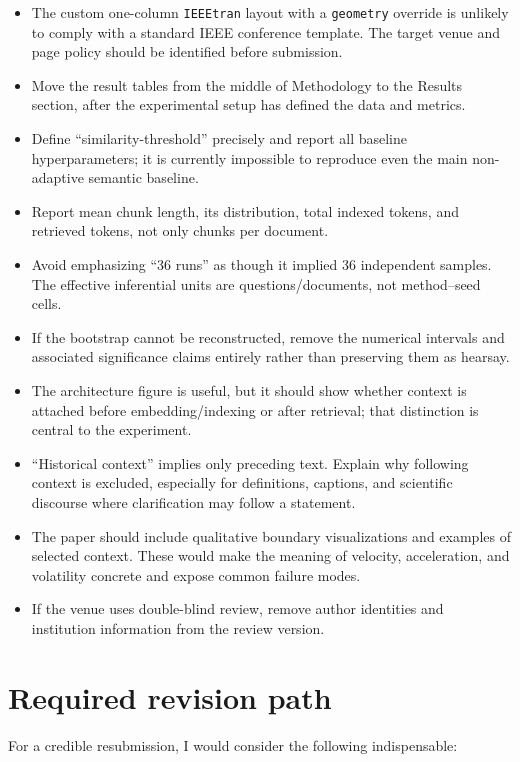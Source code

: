 \documentclass[11pt]{article}
\begin{document}
\begin{itemize}
  \item The custom one-column \texttt{IEEEtran} layout with a \texttt{geometry} override is unlikely to comply with a standard IEEE conference template. The target venue and page policy should be identified before submission.
  \item Move the result tables from the middle of Methodology to the Results section, after the experimental setup has defined the data and metrics.
  \item Define ``similarity-threshold'' precisely and report all baseline hyperparameters; it is currently impossible to reproduce even the main non-adaptive semantic baseline.
  \item Report mean chunk length, its distribution, total indexed tokens, and retrieved tokens, not only chunks per document.
  \item Avoid emphasizing ``36 runs'' as though it implied 36 independent samples. The effective inferential units are questions/documents, not method--seed cells.
  \item If the bootstrap cannot be reconstructed, remove the numerical intervals and associated significance claims entirely rather than preserving them as hearsay.
  \item The architecture figure is useful, but it should show whether context is attached before embedding/indexing or after retrieval; that distinction is central to the experiment.
  \item ``Historical context'' implies only preceding text. Explain why following context is excluded, especially for definitions, captions, and scientific discourse where clarification may follow a statement.
  \item The paper should include qualitative boundary visualizations and examples of selected context. These would make the meaning of velocity, acceleration, and volatility concrete and expose common failure modes.
  \item If the venue uses double-blind review, remove author identities and institution information from the review version.
\end{itemize}

\section*{Required revision path}

For a credible resubmission, I would consider the following indispensable:
\end{document}
